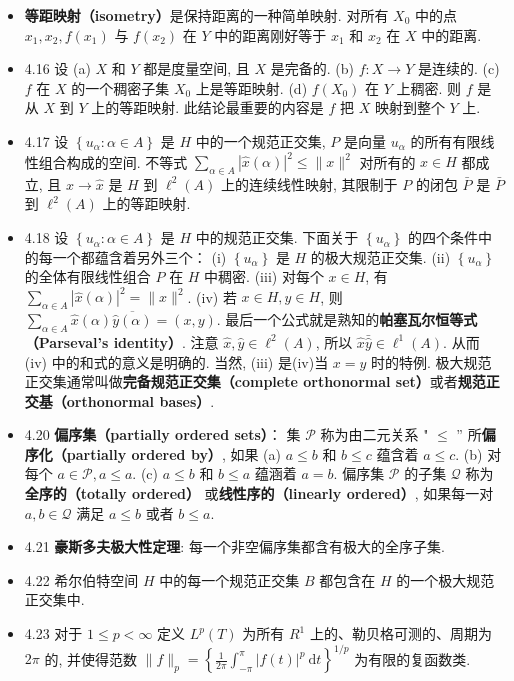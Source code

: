 \begin{itemize}
\item \textbf{等距映射（isometry）}是保持距离的一种简单映射. 对所有 $X_{0}$ 中的点 $x_{1}, x_{2}, f\left(x_{1}\right)$ 与 $f\left(x_{2}\right)$ 在 $Y$ 中的距离刚好等于 $x_{1}$ 和 $x_{2}$ 在 $X$ 中的距离.

\item 4.16 设 (a) $X$ 和 $Y$ 都是度量空间, 且 $X$ 是完备的. (b) $f: X \rightarrow Y$ 是连续的. (c) $f$ 在 $X$ 的一个稠密子集 $X_{0}$ 上是等距映射. (d) $f\left(X_{0}\right)$ 在 $Y$ 上稠密. 则 $f$ 是从 $X$ 到 $Y$ 上的等距映射. 此结论最重要的内容是 $f$ 把 $X$ 映射到整个 $Y$ 上.

\item 4.17 设 $\left\{u_{\alpha}: \alpha \in A\right\}$ 是 $H$ 中的一个规范正交集, $P$ 是向量 $u_{\alpha}$ 的所有有限线性组合构成的空间. 不等式 $\sum_{\alpha \in A}|\hat{x}(\alpha)|^{2} \leqslant\|x\|^{2}$ 对所有的 $x \in H$ 都成立, 且 $x \rightarrow \hat{x}$ 是 $H$ 到 $\ell^{2}(A)$ 上的连续线性映射, 其限制于 $P$ 的闭包 $\bar{P}$ 是 $\bar{P}$ 到 $\ell^{2}(A)$ 上的等距映射.

\item 4.18 设 $\left\{u_{\alpha}: \alpha \in A\right\}$ 是 $H$ 中的规范正交集. 下面关于 $\left\{u_{\alpha}\right\}$ 的四个条件中的每一个都蕴含着另外三个： (i) $\left\{u_{\alpha}\right\}$ 是 $H$ 的极大规范正交集. (ii) $\left\{u_{\alpha}\right\}$ 的全体有限线性组合 $P$ 在 $H$ 中稠密. (iii) 对每个 $x \in H$, 有 $\sum_{\alpha \in A}|\hat{x}(\alpha)|^{2}=\|x\|^{2}$. (iv) 若 $x \in H, y \in H$, 则 $\sum_{\alpha \in A} \hat{x}(\alpha) \overline{\hat{y}(\alpha)}=(x, y)$. 最后一个公式就是熟知的\textbf{帕塞瓦尔恒等式（Parseval's identity）}. 注意 $\hat{x},\hat{y} \in \ell^{2}(A)$, 所以 $\hat x\bar{\hat y} \in \ell^1(A)$. 从而 (iv) 中的和式的意义是明确的. 当然, (iii) 是(iv)当 $x=y$ 时的特例. 极大规范正交集通常叫做\textbf{完备规范正交集（complete orthonormal set）}或者\textbf{规范正交基（orthonormal bases）}.

\item 4.20 \textbf{偏序集（partially ordered sets）}： 集 $\mathscr{P}$ 称为由二元关系 " $\leqslant$ ” 所\textbf{偏序化（partially ordered by）}, 如果 (a) $a \leqslant b$ 和 $b \leqslant c$ 蕴含着 $a \leqslant c$. (b) 对每个 $a \in \mathscr{P}, a \leqslant a$. (c) $a \leqslant b$ 和 $b \leqslant a$ 蕴涵着 $a=b$. 偏序集 $\mathscr{P}$ 的子集 $\mathscr{Q}$ 称为\textbf{全序的（totally ordered）} 或\textbf{线性序的（linearly ordered）}, 如果每一对 $a, b \in \mathscr{Q}$ 满足 $a \leqslant b$ 或者 $b \leqslant a$.

\item 4.21 \textbf{豪斯多夫极大性定理}: 每一个非空偏序集都含有极大的全序子集.

\item 4.22 希尔伯特空间 $H$ 中的每一个规范正交集 $B$ 都包含在 $H$ 的一个极大规范正交集中.

\item 4.23 对于 $1 \leqslant p<\infty$ 定义 $L^{p}(T)$ 为所有 $R^{1}$ 上的、勒贝格可测的、周期为 $2 \pi$ 的, 并使得范数 $\|f\|_{p}=\left\{\frac{1}{2 \pi} \int_{-\pi}^{\pi}|f(t)|^{p} \mathrm{~d} t\right\}^{1 / p}$ 为有限的复函数类.
\end{itemize}


